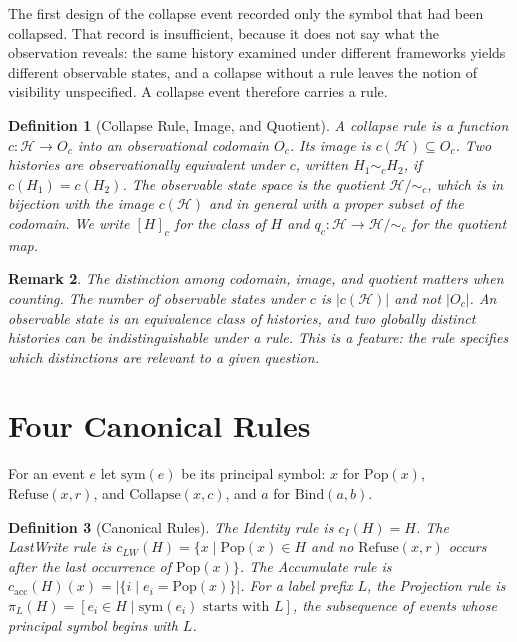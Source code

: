 \documentclass[12pt,oneside,openany]{book}
\theoremstyle{spherepop}
\newtheorem{definition}{Definition}[chapter]
\theoremstyle{remarkstyle}
\newtheorem{remark}[definition]{Remark}
\newcommand{\Pop}{\mathrm{Pop}}
\newcommand{\Rfuse}{\mathrm{Refuse}}
\newcommand{\Bind}{\mathrm{Bind}}
\newcommand{\Col}{\mathrm{Collapse}}
\newcommand{\calH}{\mathcal{H}}
\begin{document}
The first design of the collapse event recorded only the symbol that had been collapsed. That record is insufficient, because it does not say what the observation reveals: the same history examined under different frameworks yields different observable states, and a collapse without a rule leaves the notion of visibility unspecified. A collapse event therefore carries a rule.

\begin{definition}[Collapse Rule, Image, and Quotient]
\label{def:collapse-rule}
A \emph{collapse rule} is a function $c:\calH\to O_c$ into an \emph{observational codomain} $O_c$. Its \emph{image} is $c(\calH)\subseteq O_c$. Two histories are \emph{observationally equivalent under $c$}, written $H_1\sim_c H_2$, if $c(H_1)=c(H_2)$. The \emph{observable state space} is the quotient $\calH/{\sim_c}$, which is in bijection with the image $c(\calH)$ and in general with a proper subset of the codomain. We write $[H]_c$ for the class of $H$ and $q_c:\calH\to\calH/{\sim_c}$ for the quotient map.
\end{definition}

\begin{remark}
The distinction among codomain, image, and quotient matters when counting. The number of observable states under $c$ is $|c(\calH)|$ and not $|O_c|$. An observable state is an equivalence class of histories, and two globally distinct histories can be indistinguishable under a rule. This is a feature: the rule specifies which distinctions are relevant to a given question.
\end{remark}

\section{Four Canonical Rules}

For an event $e$ let $\mathrm{sym}(e)$ be its principal symbol: $x$ for $\Pop(x)$, $\Rfuse(x,r)$, and $\Col(x,c)$, and $a$ for $\Bind(a,b)$.

\begin{definition}[Canonical Rules]
The \emph{Identity} rule is $c_I(H)=H$. The \emph{LastWrite} rule is $c_{LW}(H)=\{x\mid\Pop(x)\in H$ and no $\Rfuse(x,r)$ occurs after the last occurrence of $\Pop(x)\}$. The \emph{Accumulate} rule is $c_{\mathrm{acc}}(H)(x)=|\{i\mid e_i=\Pop(x)\}|$. For a label prefix $L$, the \emph{Projection} rule is $\pi_L(H)=[e_i\in H\mid\mathrm{sym}(e_i)\text{ starts with }L]$, the subsequence of events whose principal symbol begins with $L$.
\end{definition}
\end{document}

